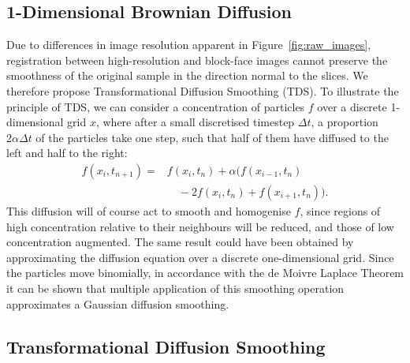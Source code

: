 	\subsection{1-Dimensional Brownian Diffusion} %
	\label{sub:a_1d_random_walk_analogy}
    Due to differences in image resolution apparent in Figure~\ref{fig:raw_images}, registration between high-resolution and block-face images cannot preserve the smoothness of the original sample in the direction normal to the slices. We therefore propose Transformational Diffusion Smoothing (TDS). To illustrate the principle of TDS, we can consider a concentration of particles $f$ over a discrete 1-dimensional grid $x$, where after a small discretised timestep $\Delta t$, a proportion $2\alpha \Delta t$ of the particles take one step, such that half of them have diffused to the left and half to the right:
	  \begin{equation}
      \begin{split}
        f(x_i, t_{n+1}) = & f(x_i, t_n) + \alpha (f(x_{i-1}, t_n) \\
                           & \quad - 2f(x_i, t_n) + f(x_{i+1}, t_n)).
      \end{split}
      \label{eqn:diffusion_1d}
		\end{equation}
	  This diffusion will of course act to smooth and homogenise $f$, since regions of high concentration relative to their neighbours will be reduced, and those of low concentration augmented. The same result could have been obtained by approximating the diffusion equation over a discrete one-dimensional grid. Since the particles move binomially, in accordance with the de Moivre Laplace Theorem it can be shown that multiple application of this smoothing operation approximates a Gaussian diffusion smoothing.
	
  \subsection{Transformational Diffusion Smoothing} %
  \label{sub:transformational_diffusion_smoothing}
